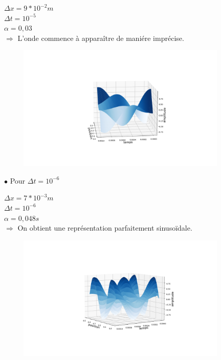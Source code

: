 \begin{enumerate}[label=\alph*)]
\begin{minipage}{.45\textwidth}%
\item $\Delta x=9*{10}^{-2}m$\\
$\Delta t={10}^{-5}$\\
$\alpha= 0,03$ \\
$\Longrightarrow$ L'onde commence à apparaître de maniére imprécise.
\end{minipage}%
\hfill
\begin{minipage}{.6\textwidth}%
\includegraphics[width=12cm,height=6cm]{dt=0.00001 et dx=0.09.png}
\end{minipage}%

\hspace*{1cm}$\bullet$ Pour $\Delta t= {10}^{-6}$ \\
\begin{minipage}{.45\textwidth}%

\item $\Delta x=7*{10}^{-3}m$ \\
$\Delta t= {10}^{-6}$ \\
$\alpha=0,048s $\\


$\Longrightarrow$ On obtient une représentation parfaitement sinusoïdale.

\end{minipage}%
\hfill
\begin{minipage}{.6\textwidth}%

\includegraphics[width=12cm,height=6cm]{dt=10^-6 avec dx= 0.007 .png}
\end{minipage}


\end{enumerate}
